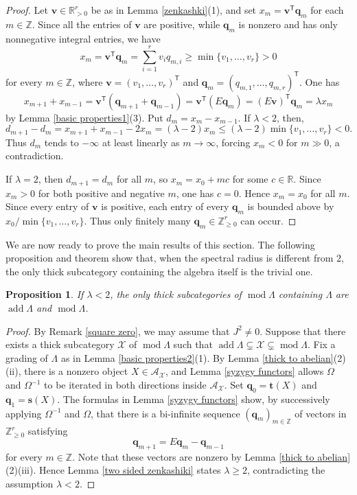 \documentclass{amsart}
\newtheorem{prop}[thm]{Proposition}
\theoremstyle{definition}
\theoremstyle{remark}
\numberwithin{equation}{thm}
\def\A{\mathcal{A}}
\def\add{\operatorname{add}}
\def\L{\Lambda}
\def\le{\leqslant}
\def\ge{\geqslant}
\def\mod{\operatorname{mod}}
\def\T{\mathsf{T}}
\def\X{\mathcal{X}}
\def\Z{\mathbb{Z}}
\def\bfs{\mathbf{s}}
\def\bft{\mathbf{t}}
\def\bfq{\mathbf{q}}
\def\bfv{\mathbf{v}}
\begin{document}
\begin{proof}
Let $\bfv\in\mathbb{R}_{>0}^r$ be as in Lemma \ref{zenkashki}(1), and set $x_m=\bfv^{\T}\bfq_m$ for each $m\in\Z$.
Since all the entries of $\bfv$ are positive, while $\bfq_m$ is nonzero and has only nonnegative integral entries, we have
$$
x_m=\bfv^{\T}\bfq_m=\sum_{i=1}^r v_iq_{m,i}\ge\min\{v_1,\ldots,v_r\}>0
$$
for every $m\in\Z$, where $\bfv=(v_1,\ldots,v_r)^{\T}$ and $\bfq_m=(q_{m,1},\ldots,q_{m,r})^{\T}$. One has
$$
x_{m+1}+x_{m-1}=\bfv^{\T}(\bfq_{m+1}+\bfq_{m-1})=\bfv^{\T}(E\bfq_m)=(E\bfv)^{\T}\bfq_m=\lambda x_m
$$
by Lemma \ref{basic properties1}(3).  Put $d_m=x_m-x_{m-1}$.  If $\lambda<2$, then,
$$
d_{m+1}-d_m=x_{m+1}+x_{m-1}-2x_m=(\lambda-2)x_m
\le (\lambda-2)\min\{v_1,\ldots,v_r\}<0.
$$
Thus $d_m$ tends to $-\infty$ at least linearly as $m\to\infty$, forcing $x_m<0$ for $m\gg0$, a contradiction.

If $\lambda=2$, then $d_{m+1}=d_m$ for all $m$, so $x_m=x_0+mc$ for some $c\in\mathbb R$.  Since $x_m>0$ for both positive and negative $m$, one has $c=0$.  Hence $x_m=x_0$ for all $m$.  Since every entry of $\bfv$ is positive, each entry of every $\bfq_m$ is bounded above by $x_0/\min\{v_1,\ldots,v_r\}$.  Thus only finitely many $\bfq_m\in\Z_{\ge0}^r$ can occur.
\end{proof}

We are now ready to prove the main results of this section. The following proposition and theorem show that, when the spectral radius is different from $2$, the only thick subcategory containing the algebra itself is the trivial one.

\begin{prop}\label{less than two}
If $\lambda<2$, the only thick subcategories of $\mod\L$ containing $\L$ are $\add\L$ and $\mod\L$.
\end{prop}

\begin{proof}
By Remark \ref{square zero}, we may assume that $J^2\ne 0$.
Suppose that there exists a thick subcategory $\X$ of $\mod\L$ such that $\add\L\subsetneq\X\subsetneq\mod\L$.
Fix a grading of $\L$ as in Lemma \ref{basic properties2}(1).
By Lemma \ref{thick to abelian}(2)(ii), there is a nonzero object $X\in\A_\X$, and Lemma \ref{syzygy functors} allows $\Omega$ and $\Omega^{-1}$ to be iterated in both directions inside $\A_\X$.
Set $\bfq_0=\bft(X)$ and $\bfq_1=\bfs(X)$. 
The formulas in Lemma \ref{syzygy functors} show, by successively applying $\Omega^{-1}$ and $\Omega$, that there is a bi-infinite sequence $(\bfq_m)_{m\in\Z}$ of vectors in $\Z_{\ge0}^r$ satisfying
$$
\bfq_{m+1}=E\bfq_m-\bfq_{m-1}
$$
for every $m\in\Z$. 
Note that these vectors are nonzero by Lemma \ref{thick to abelian}(2)(iii).
Hence Lemma \ref{two sided zenkashiki} states $\lambda\ge2$, contradicting the assumption $\lambda<2$.
\end{proof}
\end{document}
